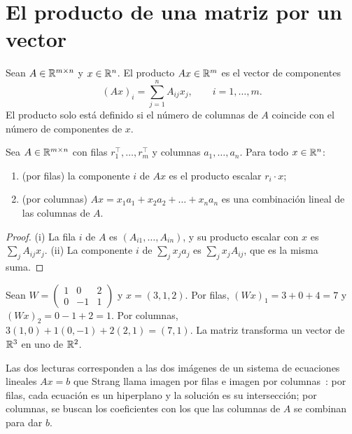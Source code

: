 \section{El producto de una matriz por un vector}

\begin{definicion}\label{def:matvec}
Sean $A\in\mathbb{R}^{m\times n}$ y $x\in\mathbb{R}^{n}$. El producto $Ax\in\mathbb{R}^{m}$ es el vector de componentes
\[
(Ax)_i=\sum_{j=1}^{n}A_{ij}x_j,\qquad i=1,\dots,m.
\]
El producto solo está definido si el número de columnas de $A$ coincide con el número de componentes de $x$.
\end{definicion}

\begin{proposicion}\label{prop:filas-columnas}
Sea $A\in\mathbb{R}^{m\times n}$ con filas $r_1^{\top},\dots,r_m^{\top}$ y columnas $a_1,\dots,a_n$. Para todo $x\in\mathbb{R}^{n}$:
\begin{enumerate}
  \item (por filas) la componente $i$ de $Ax$ es el producto escalar $r_i\cdot x$;
  \item (por columnas) $Ax=x_1a_1+x_2a_2+\dots+x_na_n$ es una combinación lineal de las columnas de $A$.
\end{enumerate}
\end{proposicion}

\begin{proof}
(i) La fila $i$ de $A$ es $(A_{i1},\dots,A_{in})$, y su producto escalar con $x$ es $\sum_jA_{ij}x_j$. (ii) La componente $i$ de $\sum_jx_ja_j$ es $\sum_jx_jA_{ij}$, que es la misma suma.
\end{proof}

\begin{ejemplo}\label{ej:matvec}
Sean $W=\begin{pmatrix}1&0&2\\0&-1&1\end{pmatrix}$ y $x=(3,1,2)$. Por filas, $(Wx)_1=3+0+4=7$ y $(Wx)_2=0-1+2=1$. Por columnas, $3(1,0)+1(0,-1)+2(2,1)=(7,1)$. La matriz transforma un vector de $\mathbb{R}^{3}$ en uno de $\mathbb{R}^{2}$.
\end{ejemplo}

Las dos lecturas corresponden a las dos imágenes de un sistema de ecuaciones lineales $Ax=b$ que Strang llama imagen por filas e imagen por columnas~\cite[§2.1]{strang}: por filas, cada ecuación es un hiperplano y la solución es su intersección; por columnas, se buscan los coeficientes con los que las columnas de $A$ se combinan para dar $b$.

